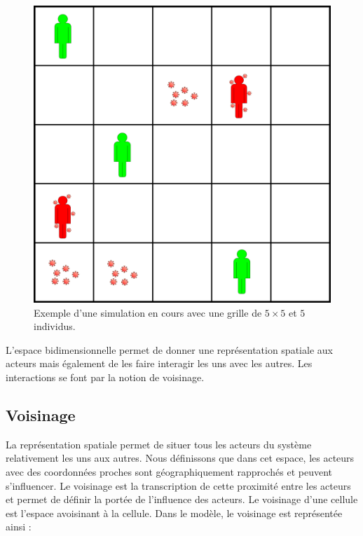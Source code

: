 \begin{figure}[h]
	\centering
	\captionsetup{justification=centering}
	\includegraphics[scale=0.5]{Images/grid.png}
	\caption[Grille régulière]{Exemple d'une simulation en cours avec une grille de $5\times 5$ et $5$ individus.}
\end{figure}

L'espace bidimensionnelle permet de donner une représentation spatiale aux acteurs mais également de les faire interagir les uns avec les autres. Les interactions se font par la notion de voisinage.

\newpage

\subsection{Voisinage}

La représentation spatiale permet de situer tous les acteurs du système relativement les uns aux autres. Nous définissons que dans cet espace, les acteurs avec des coordonnées proches sont géographiquement rapprochés et peuvent s'influencer. Le voisinage est la transcription de cette proximité entre les acteurs et permet de définir la portée de l'influence des acteurs. Le voisinage d'une cellule est l'espace avoisinant à la cellule. Dans le modèle, le voisinage est représentée ainsi :\\

